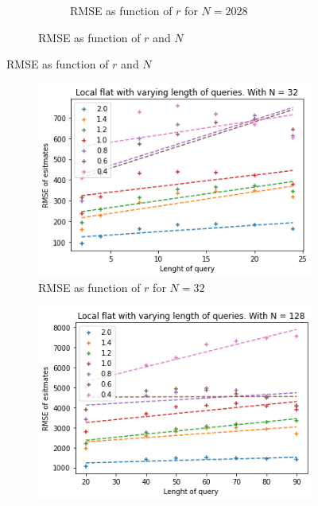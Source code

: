 \documentclass[11pt]{article}
\theoremstyle{definition}
\begin{document}
\begin{figure}[H]
\begin{subfigure}{.4\textwidth}
\begin{subfigure}{\textwidth}
  \caption{RMSE as function of $r$ for $N=2028$}
  \label{fig:a}
\end{subfigure}
\caption{RMSE as function of $r$ and $N$}
\label{fig:b}
\end{subfigure}
\caption{RMSE as function of $r$ and $N$}
\label{fig:a}
\end{figure}
\begin{figure}[H]
\centering
\begin{subfigure}{.4\textwidth}
  \centering
  \includegraphics[width=\linewidth]{figures/local_flat/varying_r/loc_flat_varying_length_N_linear_=32.png}
  \caption{RMSE as function of $r$ for $N=32$}
  \label{fig:a}
\end{subfigure}%
\begin{subfigure}{.4\textwidth}
  \centering
  \includegraphics[width=\linewidth]{figures/local_flat/varying_r/loc_flat_varying_length_N_linear_=128.png}

\end{subfigure}
\end{figure}
\end{document}
